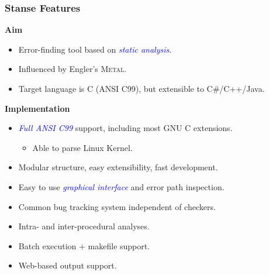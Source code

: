 \documentclass[handout,xcolor=dvipsnames]{beamer}
\let\Oldemph\emph
\renewcommand{\emph}[1]{\textcolor{blue}{\Oldemph{#1}}}
\newcommand{\heading}[1]{\textbf{\textcolor{BurntOrange}{#1}}}
\begin{document}
\begin{frame}
  \frametitle{Stanse Features}
  \heading{Aim}
  \begin{itemize}
  \item Error-finding tool based on \emph{static analysis}.
  \item Influenced by Engler's \textsc{Metal}.
  \item Target language is C (ANSI C99), but extensible to C\#/C++/Java.
  \end{itemize}

  \pause
  \medskip

  \heading{Implementation}
  \begin{itemize}
  \item \emph{Full ANSI C99} support, including most GNU C extensions.
    \begin{itemize}
    \item Able to parse Linux Kernel.
    \end{itemize}
  \item Modular structure, easy extensibility, fast development.
  \item Easy to use \emph{graphical interface} and error path inspection.
  \item Common bug tracking system independent of checkers.
  \item Intra- and inter-procedural analyses.
  \item Batch execution + makefile support.
  \item Web-based output support.
  \end{itemize}
\end{frame}
\end{document}
